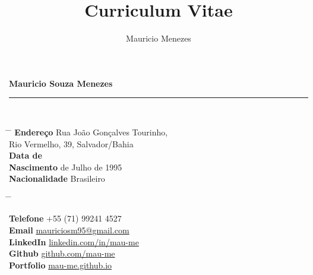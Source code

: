 \documentclass{article}
\title{Curriculum Vitae}
\author{Mauricio Menezes}
\begin{document}
{\huge{\color{slateblue}\textbf{Mauricio Souza Menezes}}} \\
\rule{\textwidth}{0.5mm} \\

\parbox{0.5\textwidth}{
	\begin{tabbing}
		\hspace{3cm} \= \hspace{4cm} \= \kill
		{\bf Endereço} \> Rua João Gonçalves Tourinho, \\
		\> Rio Vermelho, 39, Salvador/Bahia \\
		{\bf Data de } \\
		{\bf Nascimento}  de Julho de 1995 \\
		{\bf Nacionalidade} \> Brasileiro
	\end{tabbing}
}\hfil\parbox{0.5\textwidth}{
	\begin{tabbing}
		\hspace{3cm} \= \hspace{4cm} \= \kill

		{\bf Telefone}
		\> +55 (71) 99241 4527 \\

		{\bf Email} \>
		\href{mailto:mauriciosm95@gmail.com}{mauriciosm95@gmail.com} \\

		{\bf LinkedIn} \>
		\href{https://www.linkedin.com/in/mau-me/}{linkedin.com/in/mau-me} \\

		{\bf Github} \>
		\href{https://github.com/mau-me}{github.com/mau-me} \\

		{\bf Portfolio} \>
		\href{https://mau-me.github.io/maume_page/}{mau-me.github.io} \\
	\end{tabbing}
}



\end{document}

